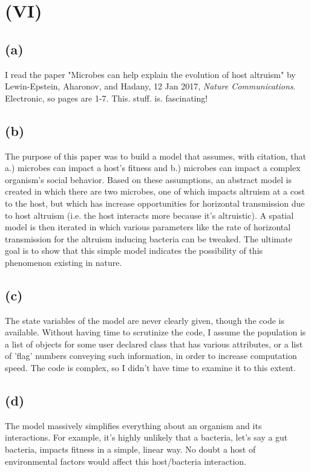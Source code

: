 \documentclass{article}
\begin{document}
 \section*{\textbf{(VI)}}
 \subsection*{\textbf{(a)}}
 I read the paper "Microbes can help explain the evolution of host altruism" by Lewin-Epstein, Aharonov, and Hadany, 12 Jan 2017, \textit{Nature Communications}. Electronic, so pages are 1-7. This. stuff. is. fascinating!
 \subsection*{\textbf{(b)}}
 The purpose of this paper was to build a model that assumes, with citation, that a.) microbes can impact a host's fitness and b.) microbes can impact a complex organism's social behavior. Based on these assumptions, an abstract model is created in which there are two microbes, one of which impacts altruism at a cost to the host, but which has increase opportunities for horizontal transmission due to host altruism (i.e. the host interacts more because it's altruistic). A spatial model is then iterated in which various parameters like the rate of horizontal transmission for the altruism inducing bacteria can be tweaked. The ultimate goal is to show that this simple model indicates the possibility of this phenomenon existing in nature.
 \subsection*{\textbf{(c)}}
 The state variables of the model are never clearly given, though the code is available. Without having time to scrutinize the code, I assume the population is a list of objects for some user declared class that has various attributes, or a list of 'flag' numbers conveying such information, in order to increase computation speed. The code is complex, so I didn't have time to examine it to this extent.
 \subsection*{\textbf{(d)}}
 The model massively simplifies everything about an organism and its interactions. For example, it's highly unlikely that a bacteria, let's say a gut bacteria, impacts fitness in a simple, linear way. No doubt a host of environmental factors would affect this host/bacteria interaction.
\end{document}
